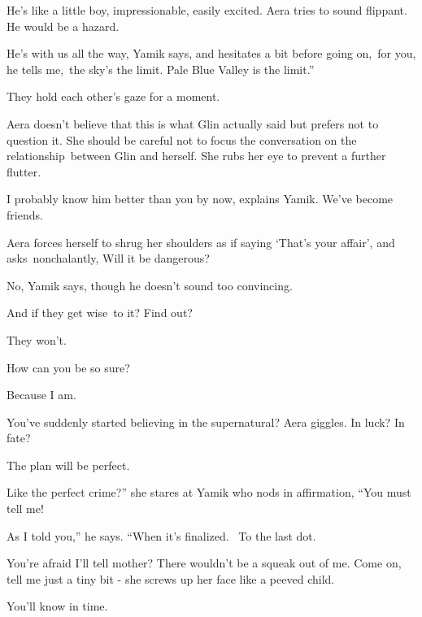 \documentclass[twoside,11pt]{book}
\begin{document}
{\textquotedbl}He's like a little boy, impressionable, easily excited.{\textquotedbl} Aera tries to sound flippant.
{\textquotedbl}He would be a hazard.{\textquotedbl}

{\textquotedbl}He's with us all the way,{\textquotedbl} Yamik says, and hesitates a bit before going
on,{\ }{\textquotedbl}for you, he tells me,~the sky's the limit. Pale Blue Valley is the limit.''

They hold each other's gaze for a moment.

Aera doesn't believe that this is what Glin actually said but prefers not to question it. She should be careful not to
focus the conversation on the relationship~between Glin and herself. She rubs her eye to prevent a further flutter.

{\textquotedbl}I probably know him better than you by now,{\textquotedbl} explains Yamik. {\textquotedbl}We've become
friends.{\textquotedbl} 

Aera forces herself to shrug her shoulders as if saying `That's your affair', and asks~nonchalantly, {\textquotedbl}Will
it be dangerous?{\textquotedbl} 

{\textquotedbl}No,{\textquotedbl} Yamik says, though he doesn't sound too convincing. 

{\textquotedbl}And if they get wise{\ }to it? Find out?{\textquotedbl} 

{\textquotedbl}They won't.{\textquotedbl}\ \ 

{\textquotedbl}How can you be so sure?{\textquotedbl} 

{\textquotedbl}Because I am.{\textquotedbl} 

{\textquotedbl}You've suddenly started believing in the supernatural?{\textquotedbl} Aera giggles. {\textquotedbl}In
luck? In fate?{\textquotedbl} 

{\textquotedbl}The plan will be perfect.{\textquotedbl} 

{\textquotedbl}Like the perfect crime?'' she stares at Yamik who nods in affirmation, ``You must tell me!{\textquotedbl}


{\textquotedbl}As I told you,'' he says. ``When it's finalized.~ To the last dot.{\textquotedbl} 

{\textquotedbl}You're afraid I'll tell mother? There wouldn't be a squeak out of me. Come on, tell me just a tiny bit
-{\textquotedbl} she screws up her face like a peeved child. 

{\textquotedbl}You'll know in time.{\textquotedbl} 
\end{document}
